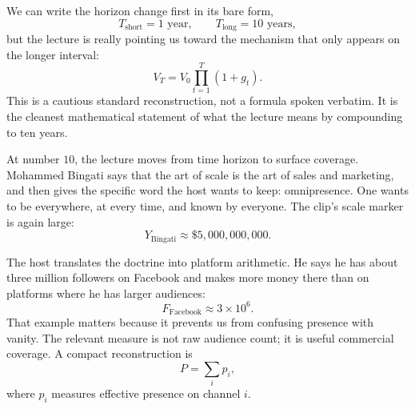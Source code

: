 We can write the horizon change first in its bare form,
\begin{equation}
T_{\mathrm{short}} = 1 \text{ year}, \qquad T_{\mathrm{long}} = 10 \text{ years},
\end{equation}
but the lecture is really pointing us toward the mechanism that only appears on the longer interval:
\begin{equation}
V_T = V_0 \prod_{t=1}^{T} (1+g_t).
\end{equation}
This is a cautious standard reconstruction, not a formula spoken verbatim. It is the cleanest mathematical statement of what the lecture means by compounding to ten years.

\begin{figure}[h]
\centering
{}
\end{figure}

At number \(10\), the lecture moves from time horizon to surface coverage. Mohammed Bingati says that the art of scale is the art of sales and marketing, and then gives the specific word the host wants to keep: omnipresence. One wants to be everywhere, at every time, and known by everyone. The clip's scale marker is again large:
\begin{equation}
Y_{\mathrm{Bingati}} \approx \$5{,}000{,}000{,}000.
\end{equation}

The host translates the doctrine into platform arithmetic. He says he has about three million followers on Facebook and makes more money there than on platforms where he has larger audiences:
\begin{equation}
F_{\mathrm{Facebook}} \approx 3 \times 10^6.
\end{equation}
That example matters because it prevents us from confusing presence with vanity. The relevant measure is not raw audience count; it is useful commercial coverage. A compact reconstruction is
\begin{equation}
P = \sum_i p_i,
\end{equation}
where \(p_i\) measures effective presence on channel \(i\).

